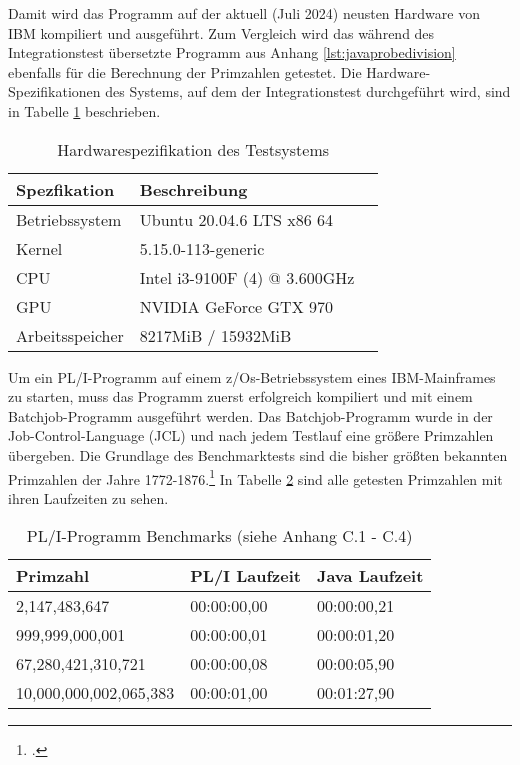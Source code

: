 Damit wird das Programm auf der aktuell (Juli 2024) neusten Hardware von IBM kompiliert und ausgeführt. Zum Vergleich wird das während des Integrationstest übersetzte Programm aus Anhang \ref{lst:javaprobedivision} ebenfalls für die Berechnung der Primzahlen getestet. 
Die Hardware-Spezifikationen des Systems, auf dem der Integrationstest durchgeführt wird, sind in Tabelle \ref{tab:hardwartable} beschrieben.

\begin{table}[h]
	\centering
	\begin{tabularx}{\textwidth}{|X|X|X|}
		\hline
		\textbf{Spezfikation} & \textbf{Beschreibung}  \\
		\hline
		Betriebssystem & Ubuntu 20.04.6 LTS x86 64 \\
		
		Kernel & 5.15.0-113-generic  \\
		
		CPU & Intel i3-9100F (4) @ 3.600GHz \\
		
		GPU & NVIDIA GeForce GTX 970  \\
		
		Arbeitsspeicher & 8217MiB / 15932MiB \\
		\hline
		
	\end{tabularx}
	\caption{Hardwarespezifikation des Testsystems \label{tab:hardwartable}}
\end{table}


Um ein PL/I-Programm auf einem z/Os-Betriebssystem eines IBM-Mainframes zu starten, muss das Programm zuerst erfolgreich kompiliert und mit einem Batchjob-Programm ausgeführt werden. Das Batchjob-Programm wurde in der Job-Control-Language (JCL) und nach jedem Testlauf eine größere Primzahlen übergeben.
Die Grundlage des Benchmarktests sind die bisher größten bekannten Primzahlen der Jahre 1772-1876.\footcite[Vgl. ][]{prime} In Tabelle \ref{tab:plibenchmark} sind alle getesten Primzahlen mit ihren Laufzeiten zu sehen. 

\begin{table}[h]
	\centering
	\begin{tabularx}{\textwidth}{|X|X|X|}
		\hline
		\textbf{Primzahl} & \textbf{PL/I Laufzeit} & \textbf{Java Laufzeit} \\
		\hline
		2,147,483,647 & 00:00:00,00 & 00:00:00,21 \\
		
		999,999,000,001 & 00:00:00,01 & 00:00:01,20\\
		
		67,280,421,310,721 & 00:00:00,08 & 00:00:05,90 \\
		
		10,000,000,002,065,383 & 00:00:01,00 & 00:01:27,90 \\
		\hline
	\end{tabularx}
	\caption{PL/I-Programm Benchmarks (siehe Anhang C.1 - C.4) \label{tab:plibenchmark}}
\end{table}


